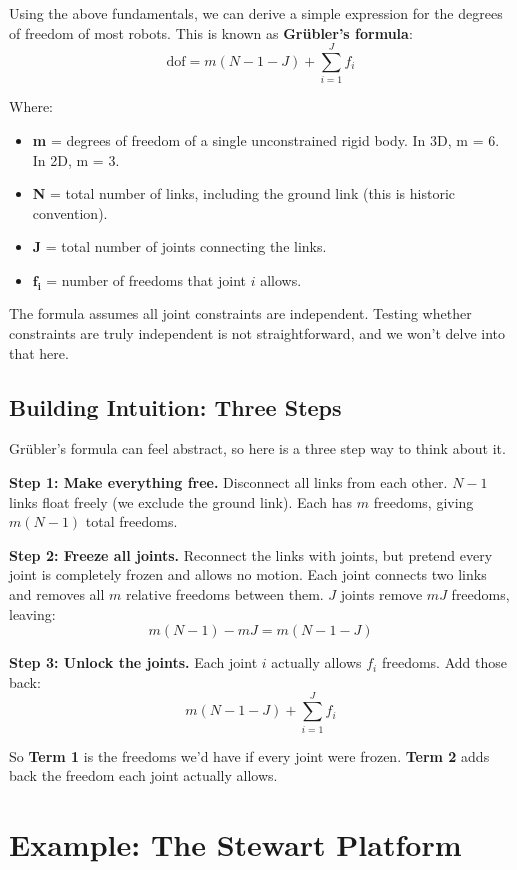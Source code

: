 \documentclass{article}
\begin{document}
Using the above fundamentals, we can derive a simple expression for the degrees of freedom of most robots. This is known as \textbf{Gr\"{u}bler's formula}:
\[
    \text{dof} = m(N - 1 - J) + \sum_{i=1}^{J} f_i
\]

Where:
\begin{itemize}
    \item \textbf{m} = degrees of freedom of a single unconstrained rigid body. In 3D, m = 6. In 2D, m = 3.
    \item \textbf{N} = total number of links, including the ground link (this is historic convention).
    \item \textbf{J} = total number of joints connecting the links.
    \item $\mathbf{f_i}$ = number of freedoms that joint $i$ allows.
\end{itemize}

The formula assumes all joint constraints are independent. Testing whether constraints are truly independent is not straightforward, and we won't delve into that here.

\subsection{Building Intuition: Three Steps}

Gr\"{u}bler's formula can feel abstract, so here is a three step way to think about it.

\textbf{Step 1: Make everything free.} Disconnect all links from each other. $N - 1$ links float freely (we exclude the ground link). Each has $m$ freedoms, giving $m(N-1)$ total freedoms.

\textbf{Step 2: Freeze all joints.} Reconnect the links with joints, but pretend every joint is completely frozen and allows no motion. Each joint connects two links and removes all $m$ relative freedoms between them. $J$ joints remove $mJ$ freedoms, leaving:
\[
    m(N - 1) - mJ = m(N - 1 - J)
\]

\textbf{Step 3: Unlock the joints.} Each joint $i$ actually allows $f_i$ freedoms. Add those back:
\[
    m(N - 1 - J) + \sum_{i=1}^{J} f_i
\]

So \textbf{Term 1} is the freedoms we'd have if every joint were frozen. \textbf{Term 2} adds back the freedom each joint actually allows.

\section{Example: The Stewart Platform}
\end{document}
